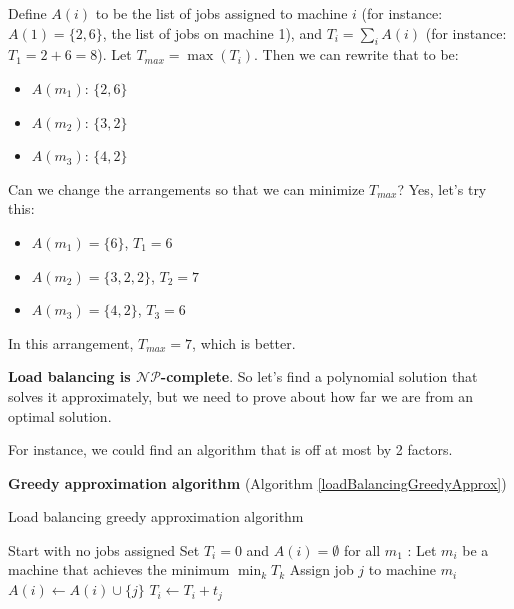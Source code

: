 \documentclass{article}
\begin{document}
Define $A(i)$ to be the list of jobs assigned to machine $i$ (for instance: $A(1) = \{2, 6\}$, the list of jobs on machine 1), and $T_i = \sum_{i} A(i)$ (for instance: $T_1 = 2 + 6 = 8$). Let $T_{max} = \max(T_i)$. Then we can rewrite that to be:

\begin{itemize}
    \item $A(m_1)$: $\{2, 6\}$
    \item $A(m_2)$: $\{3, 2\}$
    \item $A(m_3)$: $\{4, 2\}$
\end{itemize}

Can we change the arrangements so that we can minimize $T_{max}$? Yes, let's try this:

\begin{itemize}
    \item $A(m_1) = \{6\}$, $T_1 = 6$
    \item $A(m_2) = \{3, 2, 2\}$, $T_2 = 7$
    \item $A(m_3) = \{4, 2\}$, $T_3 = 6$
\end{itemize}

In this arrangement, $T_{max} = 7$, which is better.

\textbf{Load balancing is $\mathcal{NP}$-complete}. So let's find a polynomial solution that solves it approximately, but we need to prove about how far we are from an optimal solution.

For instance, we could find an algorithm that is off at most by 2 factors.

\textbf{Greedy approximation algorithm} (Algorithm \ref{loadBalancingGreedyApprox})

\begin{algorithm}
\caption{Load balancing greedy approximation algorithm}\label{loadBalancingGreedyApprox}
\begin{algorithmic}[1]
\State Start with no jobs assigned
\State Set $T_i = 0$ and $A(i) = \emptyset$ for all $m_1$
:
    \State Let $m_i$ be a machine that achieves the minimum $\min_k T_k$
    \State Assign job $j$ to machine $m_i$
    \State $A(i) \gets A(i) \cup \{j\}$
    \State $T_i \gets T_i + t_j$
\EndFor
\end{algorithmic}
\end{algorithm}

\end{document}
